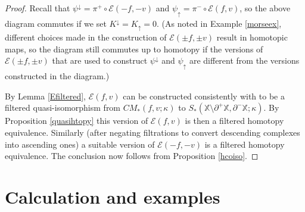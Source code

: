 \documentclass[11pt]{amsart}
\theoremstyle{definition}
\theoremstyle{remark}
\numberwithin{equation}{section}
\begin{document}
\begin{proof}
	Recall that $\psi^{\downarrow}=\pi^+\circ \mathcal{E}(-f,-v)$ and $\psi_{\uparrow}=\pi^-\circ\mathcal{E}(f,v)$, so the above diagram commutes if we set $K^{\downarrow}=K_{\uparrow}=0$.  (As noted in Example \ref{morseex}, different choices made in the construction of $\mathcal{E}(\pm f,\pm v)$ result in homotopic maps, so the diagram still commutes up to homotopy if the versions of $\mathcal{E}(\pm f,\pm v)$ that are used to construct $\psi^{\downarrow}$ and $\psi_{\uparrow}$ are different from the versions constructed in the diagram.)  
	
	By Lemma \ref{Efiltered}, $\mathcal{E}(f,v)$ can be constructed consistently with \cite{Paj} to be a filtered quasi-isomorphism from $CM_*(f,v;\kappa)$ to $S_*(\mathbb{X}\setminus\partial^+\mathbb{X},\partial^-\mathbb{X};\kappa)$.   By Proposition \ref{quasihtopy} this version of $\mathcal{E}(f,v)$ is then a filtered homotopy equivalence.  Similarly (after negating filtrations to convert descending complexes into ascending ones) a suitable version of $\mathcal{E}(-f,-v)$ is a filtered homotopy equivalence.  The conclusion now follows from Proposition \ref{hcoiso}.	
\end{proof}

 
\section{Calculation and examples}\label{calcsect}
\end{document}

